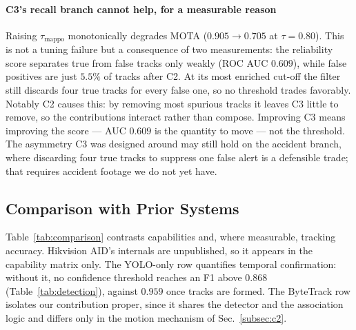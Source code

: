 \paragraph{C3's recall branch cannot help, for a measurable reason}
Raising $\tau_{\mathrm{mappo}}$ monotonically degrades MOTA
($0.905 \rightarrow 0.705$ at $\tau = 0.80$).
This is not a tuning failure but a consequence of two measurements:
the reliability score separates true from false tracks only weakly
(ROC AUC $0.609$), while false positives are just $5.5\%$ of tracks
after C2.
At its most enriched cut-off the filter still discards four true tracks
for every false one, so no threshold trades favorably.
Notably C2 causes this: by removing most spurious tracks it leaves C3
little to remove, so the contributions interact rather than compose.
Improving C3 means improving the score --- AUC $0.609$ is the quantity
to move --- not the threshold.
The asymmetry C3 was designed around may still hold on the accident
branch, where discarding four true tracks to suppress one false alert is
a defensible trade; that requires accident footage we do not yet have.

\subsection{Comparison with Prior Systems}
\label{subsec:comparison}

Table~\ref{tab:comparison} contrasts capabilities and, where
measurable, tracking accuracy.
Hikvision AID's internals are unpublished, so it appears in the
capability matrix only.
The YOLO-only row quantifies temporal confirmation: without it, no
confidence threshold reaches an F1 above $0.868$
(Table~\ref{tab:detection}), against $0.959$ once tracks are formed.
The ByteTrack row isolates our contribution proper, since it shares the
detector and the association logic and differs only in the motion
mechanism of Sec.~\ref{subsec:c2}.

\begin{table}[h]
  \centering
  \caption{Capability and accuracy comparison.}
  \label{tab:comparison}
\end{table}

